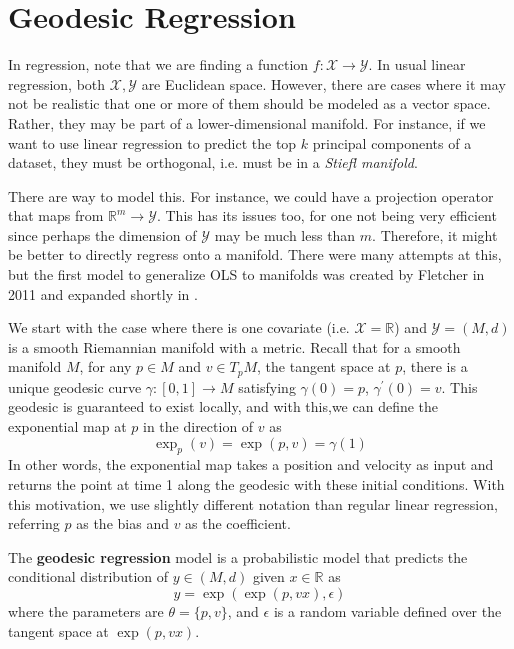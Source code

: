 \section{Geodesic Regression}

  In regression, note that we are finding a function $f: \mathcal{X} \to \mathcal{Y}$. In usual linear regression, both $\mathcal{X}, \mathcal{Y}$ are Euclidean space. However, there are cases where it may not be realistic that one or more of them should be modeled as a vector space. Rather, they may be part of a lower-dimensional manifold. For instance, if we want to use linear regression to predict the top $k$ principal components of a dataset, they must be orthogonal, i.e. must be in a \textit{Stiefl manifold}. 

  There are way to model this. For instance, we could have a projection operator that maps from $\mathbb{R}^m \to \mathcal{Y}$. This has its issues too, for one not being very efficient since perhaps the dimension of $\mathcal{Y}$ may be much less than $m$. Therefore, it might be better to directly regress onto a manifold. There were many attempts at this, but the first model to generalize OLS to manifolds was created by Fletcher in 2011 \cite{2011fletcher} and expanded shortly in \cite{2012fletcher}. 

  We start with the case where there is one covariate (i.e. $\mathcal{X} = \mathbb{R}$) and $\mathcal{Y} = (M, d)$ is a smooth Riemannian manifold with a metric. Recall that for a smooth manifold $M$, for any $p \in M$ and $v \in T_p M$, the tangent space at $p$, there is a unique geodesic curve $\gamma: [0, 1] \to M$ satisfying $\gamma(0) = p$, $\gamma^\prime (0) = v$. This geodesic is guaranteed to exist locally, and with this,we can define the exponential map at $p$ in the direction of $v$ as 
  \begin{equation}
    \exp_p (v) = \exp(p, v) = \gamma(1)
  \end{equation}
  In other words, the exponential map takes a position and velocity as input and returns the point at time 1 along the geodesic with these initial conditions. With this motivation, we use slightly different notation than regular linear regression, referring $p$ as the bias and $v$ as the coefficient. 

  \begin{definition} 
    The \textbf{geodesic regression} model is a probabilistic model that predicts the conditional distribution of $y \in (M, d)$ given $x \in \mathbb{R}$ as 
    \begin{equation}
      y = \exp(\exp(p, vx), \epsilon)
    \end{equation} 
    where the parameters are $\theta = \{p, v\}$, and $\epsilon$ is a random variable defined over the tangent space at $\exp(p, vx)$. 
  \end{definition} 

